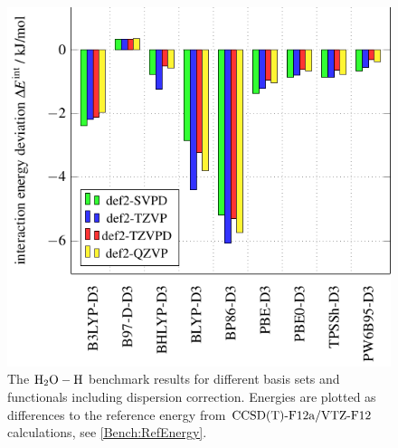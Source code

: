 \begin{figure}[b!]
\centering
% 
\includegraphics[width=.7\textwidth]{TikzPics/TikzCreation/Bench/BenchH2O+H.D3.pdf}
\caption{The $\mbox{\ensuremath{\text H _2 \text O-\text H}}$ benchmark results for different basis sets and
functionals including dispersion correction.
Energies are plotted as differences to the reference energy from $\text{CCSD(T)-F12a}/\text{VTZ-F}12$ calculations,
see \eqref{Bench:RefEnergy}.}
\label{Fig:Bench:H2O+H:D3}
\end{figure}

